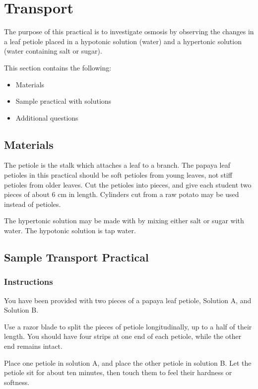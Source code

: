 \section{Transport}

The purpose of this practical is to investigate osmosis by observing the changes in a leaf petiole placed in a hypotonic solution (water) and a hypertonic solution (water containing salt or sugar). 

This section contains the following:
\begin{itemize}
\item{Materials}
\item{Sample practical with solutions}
\item{Additional questions}
\end{itemize}

\subsection{Materials}
The petiole is the stalk which attaches a leaf to a branch. The papaya leaf petioles in this practical should be soft petioles from young leaves, not stiff petioles from older leaves. Cut the petioles into pieces, and give each student two pieces of about 6 cm in length. Cylinders cut from a raw potato  may be used instead of petioles.

The hypertonic solution may be made with by mixing either salt or sugar with water. The hypotonic solution is tap water.

\subsection{Sample Transport Practical}

\subsubsection{Instructions}

You have been provided with two pieces of a papaya leaf petiole, Solution A, and Solution B.
 
Use a razor blade to split the pieces of petiole longitudinally, up to a half of their length. You should have four strips at one end of each petiole, while the other end remains intact. 

Place one petiole in solution A, and place the other petiole in solution B. Let the petiole  sit for about ten minutes, then touch them to feel their hardness or softness.

